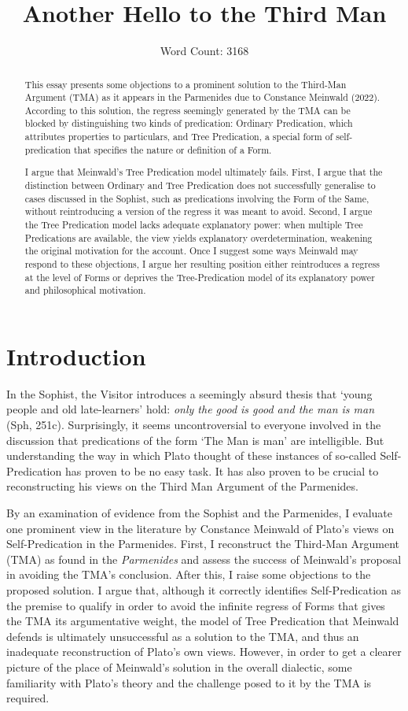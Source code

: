 \documentclass [article] {memoir}
\title{\textbf{Another Hello to the Third Man}}
\author{Word Count: 3168}
\begin{document}
\maketitle
\begin{abstract}
This essay presents some objections to a prominent solution to the Third-Man Argument (TMA) as it appears in the Parmenides due to Constance Meinwald (2022). According to this solution, the regress seemingly generated by the TMA can be blocked by distinguishing two kinds of predication: Ordinary Predication, which attributes properties to particulars, and Tree Predication, a special form of self-predication that specifies the nature or definition of a Form.

I argue that Meinwald’s  Tree Predication model ultimately fails. First, I argue that the distinction between Ordinary and Tree Predication does not successfully generalise to cases discussed in the Sophist, such as predications involving the Form of the Same, without reintroducing a version of the regress it was meant to avoid. Second, I argue the Tree Predication model lacks adequate explanatory power: when multiple Tree Predications are available, the view yields explanatory overdetermination, weakening the original motivation for the account. Once I suggest some ways Meinwald may respond to these objections, I argue her resulting position either reintroduces a regress at the level of Forms or deprives the Tree-Predication model of its explanatory power and philosophical motivation. 
\end{abstract}
\chapter{Introduction}
In the Sophist, the Visitor introduces a seemingly absurd thesis that ‘young people and old late-learners’ hold: \textit{only the good is good and the man is man} (Sph, 251c). Surprisingly, it seems uncontroversial to everyone involved in the discussion that predications of the form ‘The Man is man’ are intelligible. But understanding the way in which Plato thought of these instances of so-called Self-Predication has proven to be no easy task. It has also proven to be crucial to reconstructing his views on the Third Man Argument of the Parmenides. 

By an examination of evidence from the Sophist and the Parmenides, I evaluate one prominent view in the literature by Constance Meinwald of Plato's views on Self-Predication in the Parmenides. First, I reconstruct the Third-Man Argument (TMA) as found in the \textit{Parmenides} and assess the success of Meinwald's proposal in avoiding the TMA's conclusion. After this, I raise some objections to the proposed solution. I argue that, although it correctly identifies Self-Predication as the premise to qualify in order to avoid the infinite regress of Forms that gives the TMA its argumentative weight, the model of Tree Predication that Meinwald defends is ultimately unsuccessful as a solution to the TMA, and thus an inadequate reconstruction of Plato's own views. However, in order to get a clearer picture of the place of Meinwald's solution in the overall dialectic, some familiarity with Plato's theory and the challenge posed to it by the TMA is required. 
\end{document}
